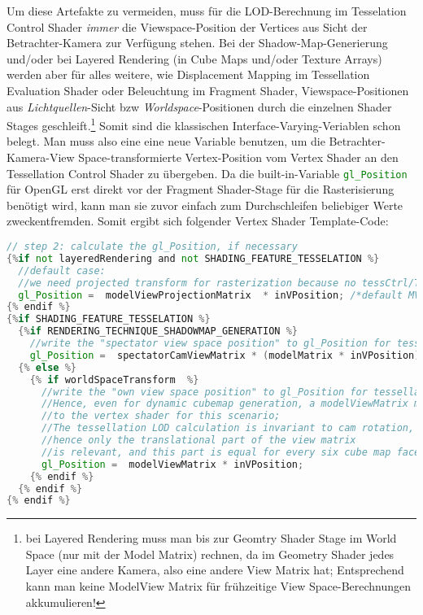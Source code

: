 	Um diese Artefakte zu vermeiden, muss für die LOD-Berechnung im Tesselation Control Shader
	\emph{immer} die Viewspace-Position der Vertices aus Sicht der Betrachter-Kamera zur Verfügung stehen.
	Bei der Shadow-Map-Generierung und/oder bei Layered Rendering (in Cube Maps und/oder Texture Arrays)
	werden aber für alles weitere, wie Displacement Mapping im Tessellation Evaluation Shader oder Beleuchtung
	im Fragment Shader, Viewspace-Positionen aus \emph{Lichtquellen}-Sicht bzw \emph{Worldspace}-Positionen durch die
	einzelnen Shader Stages geschleift.\footnote{bei Layered Rendering muss man bis zur Geomtry Shader Stage im 
	World Space (nur mit der Model Matrix) rechnen, da im Geometry Shader jedes Layer eine andere Kamera, also eine andere 
	View Matrix hat; Entsprechend kann  man keine ModelView Matrix für frühzeitige View Space-Berechnungen akkumulieren!}
	Somit sind die klassischen Interface-Varying-Veriablen schon belegt.
	Man muss also eine eine neue Variable benutzen, um die Betrachter-Kamera-View Space-transformierte Vertex-Position
	vom Vertex Shader an den Tessellation Control Shader zu übergeben. Da die built-in-Variable
	\lstinline[language=GLSL]|gl_Position| für OpenGL erst direkt vor der Fragment Shader-Stage für die Rasterisierung
	benötigt wird, kann man sie zuvor einfach zum Durchschleifen beliebiger Werte zweckentfremden. Somit ergibt sich
	folgender Vertex Shader Template-Code:
	\begin{lstlisting}[language=GLSL]
// step 2: calculate the gl_Position, if necessary 
{%if not layeredRendering and not SHADING_FEATURE_TESSELATION %} 
  //default case:
  //we need projected transform for rasterization because no tessCtrl/TessEval/geom shader follows the vertex shader;
  gl_Position =  modelViewProjectionMatrix  * inVPosition; /*default MVP transform*/   
{% endif %} 
{%if SHADING_FEATURE_TESSELATION %} 
  {%if RENDERING_TECHNIQUE_SHADOWMAP_GENERATION %}
    //write the "spectator view space position" to gl_Position for tessellation LOD calculations 
    gl_Position =  spectatorCamViewMatrix * (modelMatrix * inVPosition);
  {% else %}
    {% if worldSpaceTransform  %}
      //write the "own view space position" to gl_Position for tessellation LOD calculations; 
      //Hence, even for dynamic cubemap generation, a modelViewMatrix must be passed 
      //to the vertex shader for this scenario;
      //The tessellation LOD calculation is invariant to cam rotation, 
      //hence only the translational part of the view matrix
      //is relevant, and this part is equal for every six cube map faces;
      gl_Position =  modelViewMatrix * inVPosition;
    {% endif %}
  {% endif %}
{% endif %}
	\end{lstlisting}
	
